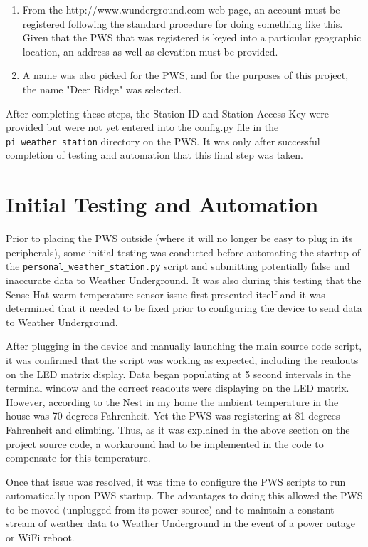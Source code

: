 \documentclass[sigconf]{acmart}
\begin{document}
\begin{enumerate}
    \item From the http://www.wunderground.com web page, an account must be registered following the standard procedure for doing something like this. Given that the PWS that was registered is keyed into a particular geographic location, an address as well as elevation must be provided. 
    \item A name was also picked for the PWS, and for the purposes of this project, the name "Deer Ridge" was selected.
\end{enumerate}

After completing these steps, the Station ID and Station Access Key were provided but were not yet entered into the config.py file in the \verb|pi_weather_station| directory on the PWS. It was only after successful completion of testing and automation that this final step was taken.

\section{Initial Testing and Automation}

Prior to placing the PWS outside (where it will no longer be easy to plug in its peripherals), some initial testing was conducted before automating the startup of the \verb|personal_weather_station.py| script and submitting potentially false and inaccurate data to Weather Underground. It was also during this testing that the Sense Hat warm temperature sensor issue first presented itself and it was determined that it needed to be fixed prior to configuring the device to send data to Weather Underground. 

After plugging in the device and manually launching the main source code script, it was confirmed that the script was working as expected, including the readouts on the LED matrix display. Data began populating at 5 second intervals in the terminal window and the correct readouts were displaying on the LED matrix. However, according to the Nest in my home the ambient temperature in the house was 70 degrees Fahrenheit. Yet the PWS was registering at 81 degrees Fahrenheit and climbing. Thus, as it was explained in the above section on the project source code, a workaround had to be implemented in the code to compensate for this temperature. 

Once that issue was resolved, it was time to configure the PWS scripts to run automatically upon PWS startup. The advantages to doing this allowed the PWS to be moved (unplugged from its power source) and to maintain a constant stream of weather data to Weather Underground in the event of a power outage or WiFi reboot. 
\end{document}
